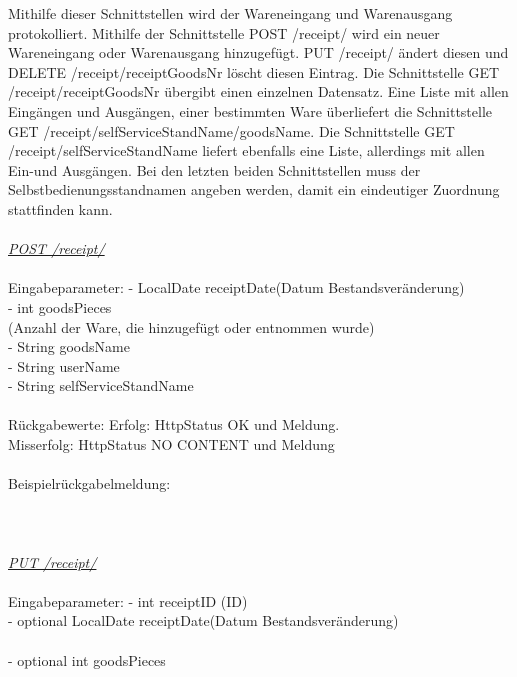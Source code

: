 Mithilfe dieser Schnittstellen wird der Wareneingang und Warenausgang protokolliert. Mithilfe der Schnittstelle POST /receipt/ wird ein neuer Wareneingang oder Warenausgang hinzugefügt. PUT /receipt/ ändert diesen und DELETE /receipt/{receiptGoodsNr} löscht diesen Eintrag.
Die Schnittstelle GET /receipt/{receiptGoodsNr} übergibt einen einzelnen Datensatz. Eine Liste mit allen Eingängen und Ausgängen, einer bestimmten Ware überliefert die Schnittstelle GET /receipt/{selfServiceStandName}/{goodsName}. Die Schnittstelle GET /receipt/{selfServiceStandName} liefert ebenfalls eine Liste, allerdings mit allen Ein-und Ausgängen.  Bei den letzten beiden Schnittstellen muss der Selbstbedienungsstandnamen angeben werden, damit ein eindeutiger Zuordnung stattfinden kann. 
\\
\\
\textit{\underline{POST /receipt/}}
\\
\\
Eingabeparameter: \tab			- LocalDate receiptDate(Datum Bestandsveränderung)\\
\tab \tab                        		- int goodsPieces\\
\tab \tab 								(Anzahl der Ware, die hinzugefügt oder entnommen wurde) \\
\tab \tab                         		- String goodsName \\
\tab \tab                         		- String userName \\                  
\tab \tab                         		- String selfServiceStandName\\
\\
Rückgabewerte: \tab 					Erfolg: HttpStatus OK und Meldung.\\
\tab \tab 								Misserfolg: HttpStatus NO CONTENT und Meldung\\
\\
Beispielrückgabelmeldung:	
\\
\\
\\
\\
\textit{\underline{PUT /receipt/}}
\\
\\
Eingabeparameter: \tab			- int receiptID (ID)\\
\tab \tab                        		- optional LocalDate receiptDate(Datum Bestandsveränderung)\\\\
\tab \tab                        		- optional int goodsPieces\\

